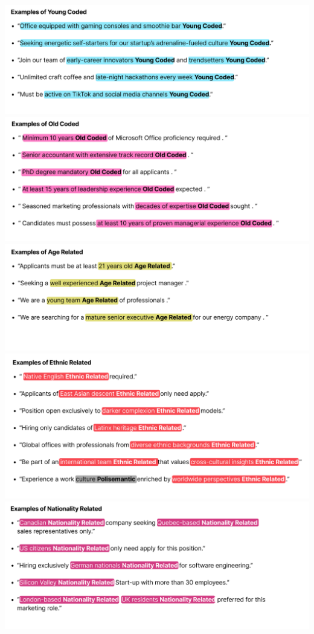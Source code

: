 \documentclass[
]{book}
\begin{document}
\includegraphics{images/example_young_coded.png}
\includegraphics{images/Old-Coded.png}
\includegraphics{images/Age-Related.png}
\includegraphics{images/Ethnic-Related.png}
\includegraphics{images/Nationality-Related.png}
\end{document}
